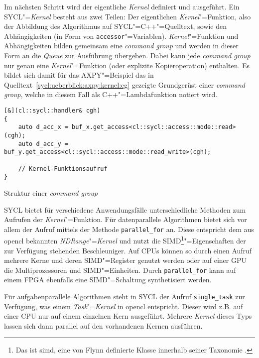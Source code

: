 Im nächsten Schritt wird der eigentliche \textit{Kernel} definiert und
ausgeführt. Ein SYCL"=\textit{Kernel} besteht aus zwei Teilen: Der eigentlichen
\textit{Kernel}"=Funktion, also der Abbildung des Algorithmus auf
SYCL"=C++"=Quelltext, sowie den Abhängigkeiten (in Form von
\texttt{accessor}"=Variablen). \textit{Kernel}"=Funktion und Abhängigkeiten
bilden gemeinsam eine \textit{command group} und werden in dieser Form an die
\textit{Queue} zur Ausführung übergeben. Dabei kann jede \textit{command group}
nur genau eine \textit{Kernel}"=Funktion (oder explizite Kopieroperation)
enthalten. Es bildet sich damit für das AXPY"=Beispiel das in
Quelltext~\ref{sycl:ueberblick:axpy:kernel:cg} gezeigte Grundgerüst einer
\textit{command group}, welche in diesem Fall als C++"=Lambdafunktion notiert
wird.

\begin{code}
    \begin{verbatim}
[&](cl::sycl::handler& cgh)
{
    auto d_acc_x = buf_x.get_access<cl::sycl::access::mode::read>(cgh);
    auto d_acc_y = buf_y.get_access<cl::sycl::access::mode::read_write>(cgh);

    // Kernel-Funktionsaufruf
}
    \end{verbatim}
    \caption{Struktur einer \textit{command group}}
    \label{sycl:ueberblick:axpy:kernel:cg}
\end{code}
\vspace{5mm}
SYCL bietet für verschiedene Anwendungsfälle unterschiedliche Methoden zum
Aufrufen der \textit{Kernel}"=Funktion. Für datenparallele Algorithmen bietet sich
vor allem der Aufruf mittels der Methode \texttt{parallel\_for} an. Diese
entspricht dem aus \gls{opencl} bekannten \textit{NDRange}"=\textit{Kernel} und
nutzt die SIMD\footnote{Das ist \gls{simd}, eine von Flynn definierte Klasse
innerhalb seiner Taxonomie \cite[vgl.][]{flynn1966}.}"=Eigenschaften der zur
Verfügung stehenden Beschleuniger. Auf CPUs können so durch einen Aufruf mehrere
Kerne und deren SIMD"=Register genutzt werden oder auf einer GPU die
Multiprozessoren und SIMD"=Einheiten. Durch \texttt{parallel\_for} kann auf
einem FPGA ebenfalls eine SIMD"=Schaltung synthetisiert werden. 

Für aufgabenparallele Algorithmen steht in SYCL der Aufruf \texttt{single\_task}
zur Verfügung, was einem \textit{Task}"=\textit{Kernel} in \gls{opencl}
entspricht. Dieser wird z.B. auf einer CPU nur auf einem einzelnen Kern
ausgeführt. Mehrere \textit{Kernel} dieses Typs lassen sich dann parallel auf
den vorhandenen Kernen ausführen.

